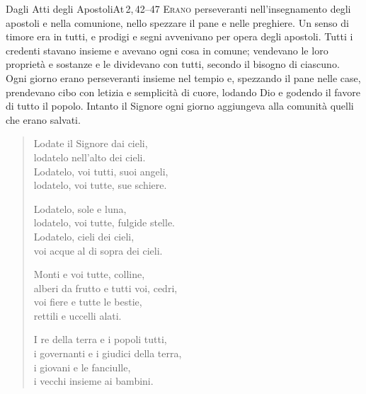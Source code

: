 \documentclass[11pt]{book}
\begin{document}
\begin{lettura}{Dagli Atti degli Apostoli}{At\,2,\,42--47}
\lettrine[lines=3]{E}{rano} perseveranti nell'insegnamento degli apostoli e nella comunione, nello spezzare il pane e nelle preghiere. Un senso di timore era in tutti, e prodigi e segni avvenivano per opera degli apostoli. Tutti i credenti stavano insieme e avevano ogni cosa in comune; vendevano le loro proprietà e sostanze e le dividevano con tutti, secondo il bisogno di ciascuno. Ogni giorno erano perseveranti insieme nel tempio e, spezzando il pane nelle case, prendevano cibo con letizia e semplicità di cuore, lodando Dio e godendo il favore di tutto il popolo. Intanto il Signore ogni giorno aggiungeva alla comunità quelli che erano salvati.
\end{lettura}

\vspace{\baselineskip}
\renewcommand{\versettosalmo}{Lodiamo insieme il nome del Signore}
\noindent{}

\noindent\rispostasalmo

\nobreak
\begin{verse}
Lodate il Signore dai cieli,\\
lodatelo nell'alto dei cieli.\\
Lodatelo, voi tutti, suoi angeli,\\
lodatelo, voi tutte, sue schiere.\\
\rispostasalmo

Lodatelo, sole e luna,\\
lodatelo, voi tutte, fulgide stelle.\\
Lodatelo, cieli dei cieli,\\
voi acque al di sopra dei cieli.\\
\rispostasalmo

Monti e voi tutte, colline,\\
alberi da frutto e tutti voi, cedri,\\
voi fiere e tutte le bestie,\\
rettili e uccelli alati.\\
\rispostasalmo

\pagebreak
I re della terra e i popoli tutti,\\
i governanti e i giudici della terra,\\
i giovani e le fanciulle,\\
i vecchi insieme ai bambini.\\
\rispostasalmo
\end{verse}
\end{document}
